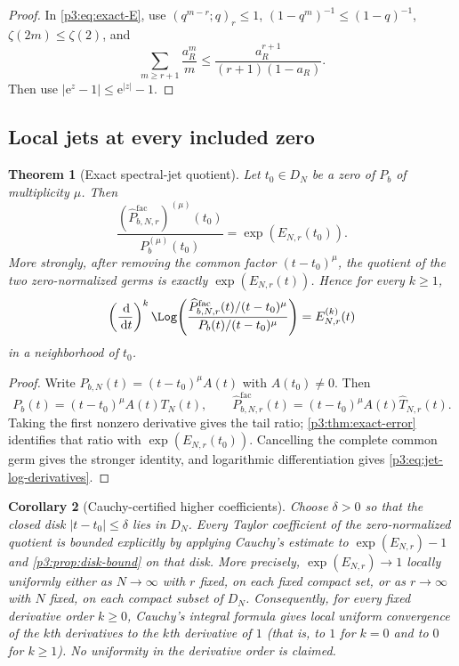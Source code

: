\documentclass[11pt]{article}
\numberwithin{equation}{section}
\newtheorem{theorem}{Theorem}[section]
\newtheorem{corollary}[theorem]{Corollary}
\theoremstyle{definition}
\theoremstyle{remark}
\newcommand{\dd}{\,\mathrm d}
\newcommand{\e}{\mathrm e}
\begin{document}
\begin{proof}
In \eqref{p3:eq:exact-E}, use
$(q^{m-r};q)_r\le1$, $(1-q^m)^{-1}\le(1-q)^{-1}$,
$\zeta(2m)\le\zeta(2)$, and
\[
 \sum_{m\ge r+1}\frac{a_R^m}{m}
 \le\frac{a_R^{r+1}}{(r+1)(1-a_R)}.
\]
Then use $|\e^z-1|\le\e^{|z|}-1$.
\end{proof}

\subsection{Local jets at every included zero}

\begin{theorem}[Exact spectral-jet quotient]\label{p3:thm:jet-quotient}
Let $t_0\in D_N$ be a zero of $P_b$ of multiplicity $\mu$.  Then
\begin{equation}
 \frac{(\widehat P^{\mathrm{fac}}_{b,N,r})^{(\mu)}(t_0)}
      {P_b^{(\mu)}(t_0)}
 =\exp(E_{N,r}(t_0)).
 \label{p3:eq:first-derivative-ratio}
\end{equation}
More strongly, after removing the common factor $(t-t_0)^\mu$, the quotient of the two
zero-normalized germs is exactly $\exp(E_{N,r}(t))$.  Hence for every $k\ge1$,
\begin{equation}
 \left(\frac{\dd}{\dd t}\right)^k
 \Log\!\left(
 \frac{\widehat P^{\mathrm{fac}}_{b,N,r}(t)/(t-t_0)^\mu}
      {P_b(t)/(t-t_0)^\mu}
 \right)
 =E_{N,r}^{(k)}(t)
 \label{p3:eq:jet-log-derivatives}
\end{equation}
in a neighborhood of $t_0$.
\end{theorem}

\begin{proof}
Write $P_{b,N}(t)=(t-t_0)^\mu A(t)$ with $A(t_0)\ne0$.  Then
\[
 P_b(t)=(t-t_0)^\mu A(t)T_N(t),\qquad
 \widehat P^{\mathrm{fac}}_{b,N,r}(t)=(t-t_0)^\mu A(t)\widehat T_{N,r}(t).
\]
Taking the first nonzero derivative gives the tail ratio; \cref{p3:thm:exact-error} identifies
that ratio with $\exp(E_{N,r}(t_0))$.  Cancelling the complete common germ gives the stronger
identity, and logarithmic differentiation gives \eqref{p3:eq:jet-log-derivatives}.
\end{proof}

\begin{corollary}[Cauchy-certified higher coefficients]\label{p3:cor:cauchy-jets}
Choose $\delta>0$ so that the closed disk $|t-t_0|\le\delta$ lies in $D_N$.  Every Taylor
coefficient of the zero-normalized quotient is bounded explicitly by applying Cauchy's
estimate to $\exp(E_{N,r})-1$ and \cref{p3:prop:disk-bound} on that disk.  More precisely,
$\exp(E_{N,r})\to1$ locally uniformly either as $N\to\infty$ with $r$ fixed, on each fixed
compact set, or as $r\to\infty$ with $N$ fixed, on each compact subset of $D_N$.
Consequently, for every fixed derivative order $k\ge0$, Cauchy's integral formula gives
local uniform convergence of the $k$th derivatives to the $k$th derivative of $1$ (that is,
to $1$ for $k=0$ and to $0$ for $k\ge1$).  No uniformity in the derivative order is claimed.
\end{corollary}
\end{document}
